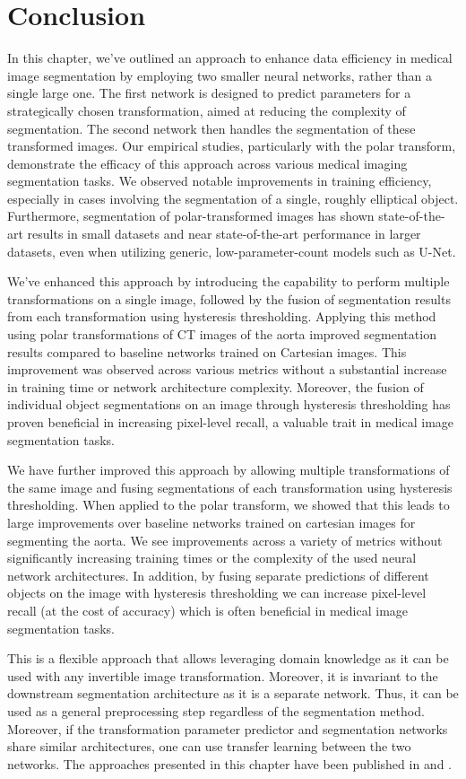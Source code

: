   \section{Conclusion}
    
In this chapter, we've outlined an approach to enhance data efficiency in medical image segmentation by employing two smaller neural networks, rather than a single large one. The first network is designed to predict parameters for a strategically chosen transformation, aimed at reducing the complexity of segmentation. The second network then handles the segmentation of these transformed images. Our empirical studies, particularly with the polar transform, demonstrate the efficacy of this approach across various medical imaging segmentation tasks. We observed notable improvements in training efficiency, especially in cases involving the segmentation of a single, roughly elliptical object. Furthermore, segmentation of polar-transformed images has shown state-of-the-art results in small datasets and near state-of-the-art performance in larger datasets, even when utilizing generic, low-parameter-count models such as U-Net.

We've enhanced this approach by introducing the capability to perform multiple transformations on a single image, followed by the fusion of segmentation results from each transformation using hysteresis thresholding. Applying this method using polar transformations of CT images of the aorta improved segmentation results compared to baseline networks trained on Cartesian images. This improvement was observed across various metrics without a substantial increase in training time or network architecture complexity. Moreover, the fusion of individual object segmentations on an image through hysteresis thresholding has proven beneficial in increasing pixel-level recall, a valuable trait in medical image segmentation tasks.

We have further improved this approach by allowing multiple transformations of the same image and fusing segmentations of each transformation using hysteresis thresholding. When applied to the polar transform, we showed that this leads to large improvements over baseline networks trained on cartesian images for segmenting the aorta. We see improvements across a variety of metrics without significantly increasing training times or the complexity of the used neural network architectures. In addition, by fusing separate predictions of different objects on the image with hysteresis thresholding we can increase pixel-level recall (at the cost of accuracy) which is often beneficial in medical image segmentation tasks. 

This is a flexible approach that allows leveraging domain knowledge as it can be used with any invertible image transformation. Moreover, it is invariant to the downstream segmentation architecture as it is a separate network. Thus, it can be used as a general preprocessing step regardless of the segmentation method. Moreover, if the transformation parameter predictor and segmentation networks share similar architectures, one can use transfer learning between the two networks. The approaches presented in this chapter have been published in \cite{bencevicTrainingPolarImage2021} and \cite{bencevicUsingPolarTransform2022a}.
